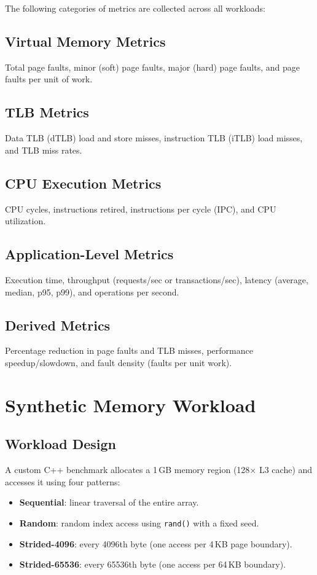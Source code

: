 \documentclass[conference]{IEEEtran}
\begin{document}
The following categories of metrics are collected across all workloads:

\subsection{Virtual Memory Metrics}
Total page faults, minor (soft) page faults, major (hard) page faults, and page faults per unit of work.

\subsection{TLB Metrics}
Data TLB (dTLB) load and store misses, instruction TLB (iTLB) load misses, and TLB miss rates.

\subsection{CPU Execution Metrics}
CPU cycles, instructions retired, instructions per cycle (IPC), and CPU utilization.

\subsection{Application-Level Metrics}
Execution time, throughput (requests/sec or transactions/sec), latency (average, median, p95, p99), and operations per second.

\subsection{Derived Metrics}
Percentage reduction in page faults and TLB misses, performance speedup/slowdown, and fault density (faults per unit work).

\section{Synthetic Memory Workload}

\subsection{Workload Design}

A custom C++ benchmark allocates a 1\,GB memory region (128$\times$ L3 cache) and accesses it using four patterns:
\begin{itemize}
    \item \textbf{Sequential}: linear traversal of the entire array.
    \item \textbf{Random}: random index access using \texttt{rand()} with a fixed seed.
    \item \textbf{Strided-4096}: every 4096th byte (one access per 4\,KB page boundary).
    \item \textbf{Strided-65536}: every 65536th byte (one access per 64\,KB boundary).
\end{itemize}
\end{document}
